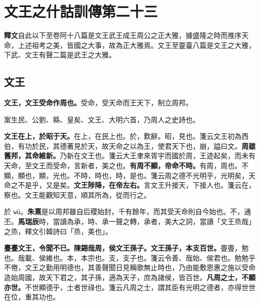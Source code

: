 \chapter{文王之什詁訓傳第二十三}

\begin{quoting}\textbf{釋文}自此以下至卷阿十八篇是文王武王成王周公之正大雅，據盛隆之時而推序天命，上述祖考之美，皆國之大事，故為正大雅焉。文王至靈臺八篇是文王之大雅，下武、文王有聲二篇是武王之大雅。\end{quoting}

\section{文王}


\textbf{文王，文王受命作周也。}{\footnotesize 受命，受天命而王天下，制立周邦。}

\begin{quoting}案生民、公劉、緜、皇矣、文王、大明六首，乃周人之史詩也。\end{quoting}

\textbf{文王在上，於昭于天。}{\footnotesize 在上，在民上也。於，歎辭。昭，見也。箋云文王初為西伯，有功於民，其德著見於天，故天命之以為王，使君天下也，崩，謚曰文。}\textbf{周雖舊邦，其命維新。}{\footnotesize 乃新在文王也。箋云大王聿來胥宇而國於周，王迹起矣，而未有天命，至文王而受命，言新者，美之也。}\textbf{有周不顯，帝命不時。}{\footnotesize 有周，周也。不顯，顯也，顯，光也。不時，時也，時，是也。箋云周之德不光明乎，光明矣，天命之不是乎，又是矣。}\textbf{文王陟降，在帝左右。}{\footnotesize 言文王升接天，下接人也。箋云在，察也。文王能觀知天意，順其所為，從而行之。}

\begin{quoting}於 \texttt{wū}。\textbf{朱熹}是以周邦雖自后稷始封，千有餘年，而其受天命則自今始也。不，通丕。\textbf{馬瑞辰}時，當讀為承，時、承一聲之轉，承者，美大之詞，當讀「文王烝哉」之烝，釋文引韓詩曰「烝，美也」。\end{quoting}

\textbf{亹亹文王，令聞不已。陳錫哉周，侯文王孫子。文王孫子，本支百世。}{\footnotesize 亹亹，勉也。哉載、侯維也。本，本宗也。支，支子也。箋云令善、哉始、侯君也。勉勉乎不倦，文王之勤用明德也，其善聲聞日見稱歌無止時也，乃由能敷恩惠之施以受命造始周國，故天下君之，其子孫，適為天子，庶為諸侯，皆百世。}\textbf{凡周之士，不顯亦世。}{\footnotesize 不世顯德乎，士者世祿也。箋云凡周之士，謂其臣有光明之德者，亦得世世在位，重其功也。}

